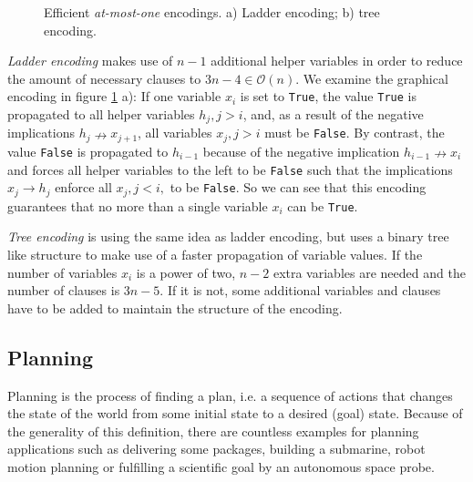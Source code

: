 \documentclass{article}
\theoremstyle{definition}
\begin{document}
\begin{figure}
\caption{Efficient \emph{at-most-one} encodings. a) Ladder encoding; b) tree encoding. }
\label{fig:atmostone_encodings}
\end{figure}

\emph{Ladder encoding} makes use of $n-1$ additional helper variables in order to reduce the amount of necessary clauses to $3n-4 \in \mathcal{O}(n)$. We examine the graphical encoding in figure \ref{fig:atmostone_encodings} a): If one variable $x_i$ is set to \texttt{True}, the value \texttt{True} is propagated to all helper variables $h_j, j > i$, and, as a result of the negative implications $h_j \nrightarrow x_{j+1}$, all variables $x_j, j > i$ must be \texttt{False}. By contrast, the value \texttt{False} is propagated to $h_{i-1}$ because of the negative implication $h_{i-1} \nrightarrow x_i$ and forces all helper variables to the left to be \texttt{False} such that the implications $x_j \rightarrow h_j$ enforce all $x_j, j < i,$ to be \texttt{False}. So we can see that this encoding guarantees that no more than a single variable $x_i$ can be \texttt{True}.

\emph{Tree encoding} is using the same idea as ladder encoding, but uses a binary tree like structure to make use of a faster propagation of variable values. If the number of variables $x_i$ is a power of two, $n-2$ extra variables are needed and the number of clauses is $3n-5$. If it is not, some additional variables and clauses have to be added to maintain the structure of the encoding.

\subsection{Planning}

Planning is the process of finding a plan, i.e. a sequence of actions that changes the state of the world from some initial state to a desired (goal) state. Because of the generality of this definition, there are countless examples for planning applications such as delivering some packages, building a submarine, robot motion planning or fulfilling a scientific goal by an autonomous space probe.
\end{document}
